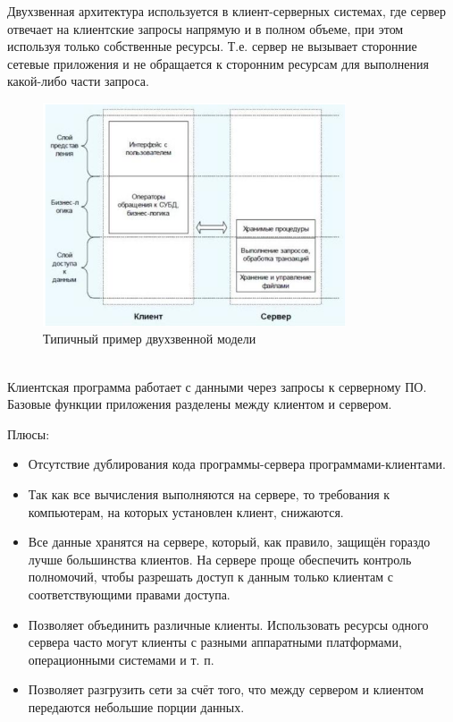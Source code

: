 Двухзвенная архитектура используется в клиент-серверных системах, где сервер отвечает
на клиентские запросы напрямую и в полном объеме, при этом используя только
собственные ресурсы. Т.е. сервер не вызывает сторонние сетевые приложения и не
обращается к сторонним ресурсам для выполнения какой-либо части запроса.

\begin{figure}[h!]
    \centering
    \includegraphics[width=0.8\textwidth]{assets/663}
    \caption{Типичный пример двухзвенной модели}
\end{figure}~\\

Клиентская программа работает с данными через запросы к серверному ПО. Базовые
функции приложения разделены между клиентом и сервером.

Плюсы:
\begin{itemize}
    \item Отсутствие дублирования кода программы-сервера программами-клиентами.
    \item Так как все вычисления выполняются на сервере, то требования к компьютерам, на которых установлен клиент, снижаются.
    \item Все данные хранятся на сервере, который, как правило, защищён гораздо лучше большинства клиентов. На сервере проще обеспечить контроль полномочий, чтобы разрешать доступ к данным только клиентам с соответствующими правами доступа.
    \item Позволяет объединить различные клиенты. Использовать ресурсы одного сервера часто могут клиенты с разными аппаратными платформами, операционными системами и т. п.
    \item Позволяет разгрузить сети за счёт того, что между сервером и клиентом передаются небольшие порции данных.
\end{itemize}

